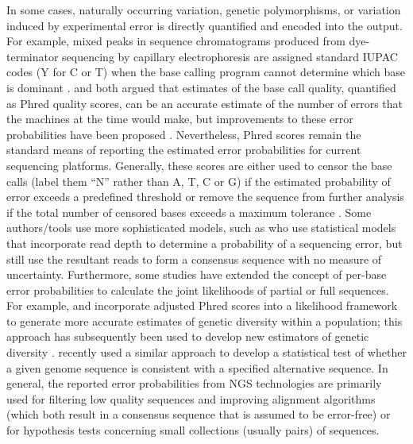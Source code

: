 \documentclass[12pt]{article}
\begin{document}
In some cases, naturally occurring variation, \ie genetic polymorphisms, or variation induced by experimental error is directly quantified and encoded into the output.
For example, mixed peaks in sequence chromatograms produced from dye-terminator sequencing by capillary electrophoresis are assigned standard IUPAC codes (\eg Y for C or T) when the base calling program cannot determine which base is dominant \citep{NomenclatureIncompletelySpecified1986}.
\cite{ewingBaseCallingAutomatedSequencer1998} and \cite{richterichEstimationErrorsRaw1998} both argued that estimates of the base call quality, quantified as Phred quality scores, can be an accurate estimate of the number of errors that the machines at the time would make, but improvements to these error probabilities have been proposed \citep{liAdjustQualityScores2004, liSNPDetectionMassively2009}. 
Nevertheless, Phred scores remain the standard means of reporting the estimated error probabilities for current sequencing platforms.
Generally, these scores are either used to censor the base calls (\ie label them ``N'' rather than A, T, C or G) if the estimated probability of error exceeds a predefined threshold or remove the sequence from further analysis if the total number of censored bases exceeds a maximum tolerance \citep[\eg ][]{doroninaPhylogeneticPositionEmended2005, robaskyRoleReplicatesError2014,oraweAccountingUncertaintyDNA2015}.
Some authors/tools use more sophisticated models, such as \cite{wuEstimatingErrorModels2017} who use statistical models that incorporate read depth to determine a probability of a sequencing error, but still use the resultant reads to form a consensus sequence with no measure of uncertainty.
Furthermore, some studies have extended the concept of per-base error probabilities to calculate the joint likelihoods of partial or full sequences.
For example, \cite{depristoFrameworkVariationDiscovery2011} and \cite{gompertHierarchicalBayesianModel2011} incorporate adjusted Phred scores into a likelihood framework to generate more accurate estimates of genetic diversity within a population; this approach has subsequently been used to develop new estimators of genetic diversity \citep{fumagalliQuantifyingPopulationGenetic2013a}. 
\cite{kuoEAGLEExplicitAlternative2018} recently used a similar approach to develop a statistical test of whether a given genome sequence is consistent with a specified alternative sequence.
In general, the reported error probabilities from NGS technologies are primarily used for filtering low quality sequences and improving alignment algorithms (which both result in a consensus sequence that is assumed to be error-free) or for hypothesis tests concerning small collections (usually pairs) of sequences.
\end{document}
